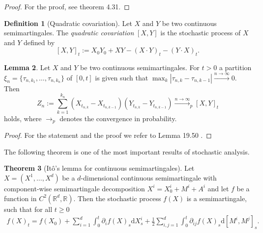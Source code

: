 \documentclass[11pt,titlepage]{article}
\newcommand{\R}{\mathbb{R}} %
\newcommand{\abs}[1]{{\left| #1 \right|}}
\theoremstyle{definition}
\newtheorem{theorem}{Theorem}[section]
\newtheorem{lemma}[theorem]{Lemma}
\newtheorem{definition}[theorem]{Definition}
\theoremstyle{remark}
\begin{document}
	
	\begin{proof}
		For the proof, see \cite{Jacod2003} theorem 4.31.
	\end{proof}

	\begin{definition}[Quadratic covariation]\label{Def quadr covariation}
		Let $X$ and $Y$ be two continuous semimartingales. The \textsl{quadratic covariation} $[X,Y]$ is the stochastic process of $X$ and $Y$ defined by
		\[[X,Y]_t:= X_0Y_0 +XY - (X\cdot Y)_t - (Y\cdot X)_t.\]
	\end{definition}

	\begin{lemma}\label{lemma covariation}
		Let $X$ and $Y$ be two continuous semimartingales. For $t >0$ a partition $\xi_n =\{\tau_{n,k_1},\ldots,\tau_{n,k_n}\}$ of $[0,t]$ is given such that $\max_k \abs{\tau_{n,k}-\tau_{n,k-1}} \xrightarrow{n\to\infty}0$. Then 
		\[Z_n := \sum_{k=1}^{k_n} (X_{t_{n,k}}-X_{t_{n,k-1}})(Y_{t_{n,k}}-Y_{t_{n,k-1}})\xrightarrow{n\to\infty}_p [X,Y]_t\]
		holds, where $\to_p$ denotes the convergence in probability.
	\end{lemma}
	
	\begin{proof}
		For the statement and the proof we refer to Lemma 19.50 \cite{Pfaffelhuber2020}.
	\end{proof}

	The following theorem is one of the most important results of stochastic analysis.
	
	\begin{theorem}[Itô's lemma for continuous semimartingales] \label{Itos lemma}
		Let $X=(X^1,\ldots, X^d)$ be a $d$-dimensional continuous semimartingale 
		with component-wise semimartingale decomposition $X^i = X_0^i + M^i + A^i$ and let $f$ be a function in $C^2(\R^d, \R)$. Then the stochastic process $f(X)$ is a semimartingale, such that for all $t\geq 0$
		\begin{align*}
			f(X)_t = f(X_0) + \sum_{i=1}^d \int_0^t\partial_i f(X)_s \mathrm{d}X^i_s + 
			\frac{1}{2} \sum_{i,j=1}^d \int_0^t\partial_{ij} f(X)_s \mathrm{d}[M^i, M^j]_s.
		\end{align*}
		
	\end{theorem}
\end{document}
